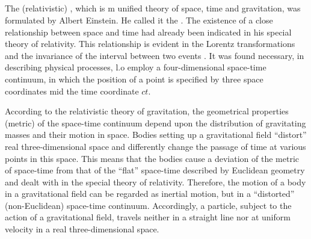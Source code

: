 \subsection{}\label{6.2.7} The  (relativistic) , which is m unified theory of space, time and gravitation, was formulated by Albert Einstein. He called it the . The existence of a close relationship between space and time had already been indicated in his special theory of relativity. This relationship is evident in the Lorentz transformations  and the invariance of the interval between two events . It was found necessary, in describing physical processes, l.o employ a four-dimensional space-time continuum, in which the position of a point is specified by three space coordinates mid the time coordinate $ct$.

According to the relativistic theory of gravitation, the geo­metrical properties (metric) of the space-time continuum depend upon the distribution of gravitating masses and their motion in space. Bodies setting up a gravitational field ``distort'' real three-dimensional space and differently change the passage of time at various points in this space. This means that the bodies cause a deviation of the metric of space-time from that of the ``flat'' space-time described by Euclidean geometry and dealt with in the special theory of relativity. Therefore, the motion of a body in a gravitational field can be regarded as inertial motion, but in a ``distorted'' (non-Euclidean) space-time continuum. Accordingly, a particle, subject to the action of a gravitational field, travels neither in a straight line nor at uniform velocity in a real three-dimensional space.

